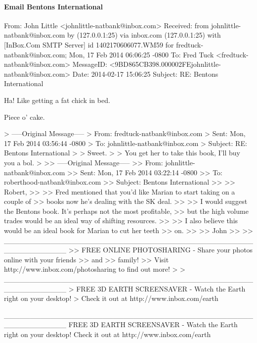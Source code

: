 \paragraph{Email Bentons International}
\label{Bentons}
\begin{spverbatim}
From: John Little <johnlittle-natbank@inbox.com>
Received: from johnlittle-natbank@inbox.com by (127.0.0.1:25) via inbox.com
  (127.0.0.1:25) with [InBox.Com SMTP Server] id 1402170606077.WM59 for
  fredtuck-natbank@inbox.com; Mon, 17 Feb 2014 06:06:25 -0800
To: Fred Tuck <fredtuck-natbank@inbox.com>
MessageID: <9BD865CB398.000002FEjohnlittle-natbank@inbox.com>
Date: 2014-02-17 15:06:25
Subject: RE: Bentons International

Ha! Like getting a fat chick in bed. 

Piece o' cake.

> -----Original Message-----
> From: fredtuck-natbank@inbox.com
> Sent: Mon, 17 Feb 2014 03:56:44 -0800
> To: johnlittle-natbank@inbox.com
> Subject: RE: Bentons International
> 
> Sweet.
> 
> You get her to take this book, I'll buy you a bol.
> 
>> -----Original Message-----
>> From: johnlittle-natbank@inbox.com
>> Sent: Mon, 17 Feb 2014 03:22:14 -0800
>> To: roberthood-natbank@inbox.com
>> Subject: Bentons International
>> 
>> Robert,
>> 
>> Fred mentioned that you'd like Marian to start taking on a couple of
>> books now he's dealing with the SK deal.
>> 
>> I would suggest the Bentons book. It's perhaps not the most profitable,
>> but the high volume trades would be an ideal way of shifting resources.
>> 
>> I also believe this would be an ideal book for Marian to cut her teeth
>> on.
>> 
>> John
>> 
>> ____________________________________________________________
>> FREE ONLINE PHOTOSHARING - Share your photos online with your friends
>> and
>> family!
>> Visit http://www.inbox.com/photosharing to find out more!
> 
> ____________________________________________________________
> FREE 3D EARTH SCREENSAVER - Watch the Earth right on your desktop!
> Check it out at http://www.inbox.com/earth

____________________________________________________________
FREE 3D EARTH SCREENSAVER - Watch the Earth right on your desktop!
Check it out at http://www.inbox.com/earth



\end{spverbatim}

